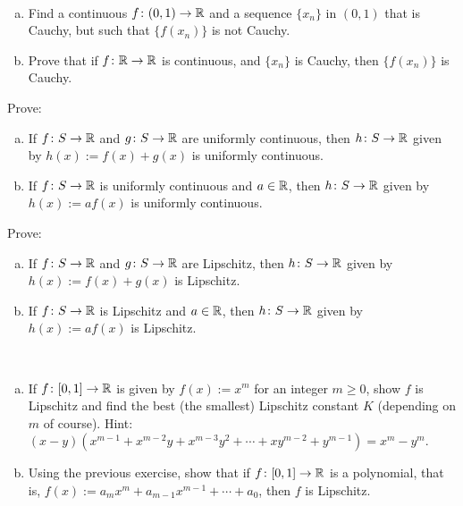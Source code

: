 \begin{exercise}
{\ }
\begin{enumerate}[a)]
\item
Find a continuous $f \colon (0,1) \to {\mathbb{R}}$ and a sequence $\{ x_n \}$ in
$(0,1)$ that is Cauchy, but such that $\{ f(x_n) \}$ is not Cauchy.
\item
Prove that if $f \colon {\mathbb{R}} \to {\mathbb{R}}$ is continuous, and $\{ x_n \}$ is
Cauchy, then $\{ f(x_n) \}$ is Cauchy.
\end{enumerate}
\end{exercise}

\begin{exercise}
Prove:
\begin{enumerate}[a)]
\item
If $f \colon S \to {\mathbb{R}}$ and $g \colon S \to {\mathbb{R}}$ are uniformly continuous,
then $h \colon S \to {\mathbb{R}}$ given by $h(x) := f(x) + g(x)$
is uniformly continuous.
\item
If $f \colon S \to {\mathbb{R}}$ is uniformly continuous and $a \in {\mathbb{R}}$,
then $h \colon S \to {\mathbb{R}}$ given by $h(x) := a f(x)$
is uniformly continuous.
\end{enumerate}
\end{exercise}

\begin{exercise}
Prove:
\begin{enumerate}[a)]
\item
If $f \colon S \to {\mathbb{R}}$ and $g \colon S \to {\mathbb{R}}$ are Lipschitz,
then $h \colon S \to {\mathbb{R}}$ given by $h(x) := f(x) + g(x)$
is Lipschitz.
\item
If $f \colon S \to {\mathbb{R}}$ is Lipschitz and $a \in {\mathbb{R}}$,
then $h \colon S \to {\mathbb{R}}$ given by $h(x) := a f(x)$
is Lipschitz.
\end{enumerate}
\end{exercise}

\begin{exercise}
{\ }
\begin{enumerate}[a)]
\item
If $f \colon [0,1] \to {\mathbb{R}}$ is given by $f(x) := x^m$ for an integer
$m \geq 0$,
show $f$ is Lipschitz and find the best (the smallest) Lipschitz constant
$K$ (depending on $m$ of course).
Hint: $(x-y)(x^{m-1} + x^{m-2}y + x^{m-3}y^2 + \cdots + x y^{m-2} + y^{m-1}) = x^m - y^m$.
\item
Using the previous exercise, show that if $f \colon [0,1] \to {\mathbb{R}}$
is a polynomial, that is, $f(x) := a_m x^m + a_{m-1} x^{m-1} + \cdots + a_0$,
then $f$ is Lipschitz.
\end{enumerate}
\end{exercise}

